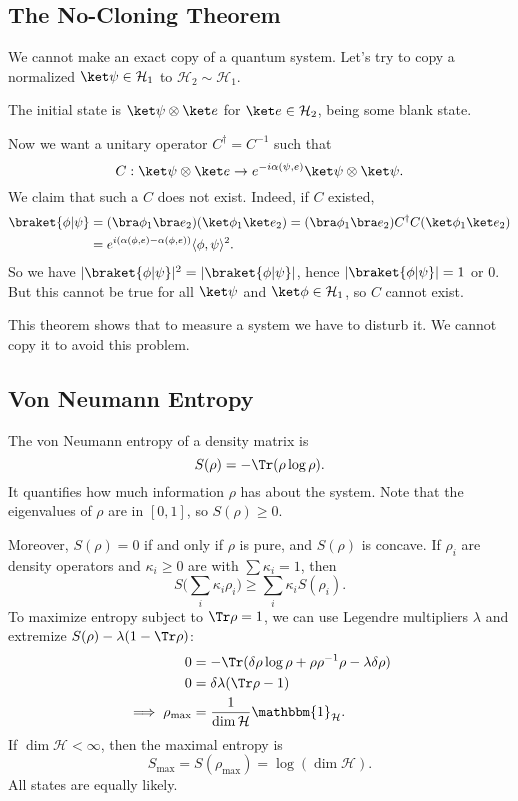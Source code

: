 \documentclass[12pt]{article}
\begin{document}
\subsection{The No-Cloning Theorem}
\label{sub:nc_thm}

We cannot make an exact copy of a quantum system. Let's try to copy a normalized $\ket \psi \in \mathcal{H}_1$ to $\mathcal{H}_2 \sim \mathcal{H}_1$.

The initial state is $\ket \psi \otimes \ket e$ for $\ket e \in \mathcal{H}_2$, being some blank state.

Now we want a unitary operator $C^{\dagger} = C^{-1}$ such that
\[
C : \ket \psi \otimes \ket e \to e^{-i \alpha(\psi, e)} \ket \psi \otimes \ket \psi.
\]
We claim that such a $C$ does not exist. Indeed, if $C$ existed,
\begin{align*}
	\braket{\phi|\psi} &= (\bra \phi_1 \bra e_2) (\ket \phi_1 \ket e_2) = (\bra \phi_1 \bra e_2) C^{\dagger} C (\ket \phi_1 \ket e_2) \\
			   &= e^{i( \alpha(\phi, e) - \alpha(\phi, e))} \langle \phi, \psi\rangle^2.
\end{align*}
So we have $|\braket{\phi|\psi}|^2 = |\braket{\phi|\psi}|$, hence $|\braket{\phi|\psi}| = 1$ or $0$. But this cannot be true for all $\ket \psi$ and $\ket \phi \in \mathcal{H}_1$, so $C$ cannot exist.

This theorem shows that to measure a system we have to disturb it. We cannot copy it to avoid this problem.

\subsection{Von Neumann Entropy}
\label{sub:entropy}

The von Neumann entropy of a density matrix is
\[
S(\rho) = - \Tr (\rho \log \rho).
\]
It quantifies how much information $\rho$ has about the system. Note that the eigenvalues of $\rho$ are in $[0, 1]$, so $S(\rho) \geq 0$.

Moreover, $S(\rho) = 0$ if and only if $\rho$ is pure, and $S(\rho)$ is concave. If $\rho_i$ are density operators and $\kappa_i \geq 0$ are with $\sum \kappa_i = 1$, then
\[
S \biggl( \sum_i \kappa_i \rho_i \biggr) \geq \sum_i \kappa_i S(\rho_i).
\]
To maximize entropy subject to $\Tr \rho = 1$, we can use Legendre multipliers $\lambda$ and extremize $S(\rho) - \lambda(1 - \Tr \rho)$:
\begin{align*}
	0 &= - \Tr(\delta \rho \log \rho + \rho \rho^{-1} \rho - \lambda \delta \rho) \\
	0 &= \delta \lambda (\Tr \rho - 1) \\
	\implies \rho_{\mathrm{max}} &= \frac{1}{\dim \mathcal{H}} \mathbbm{1}_{\mathcal{H}}.
\end{align*}
If $\dim \mathcal{H} < \infty$, then the maximal entropy is
\[
S_{\mathrm{max}} = S(\rho_{\mathrm{max}}) = \log (\dim \mathcal{H}).
\]
All states are equally likely.
\end{document}
